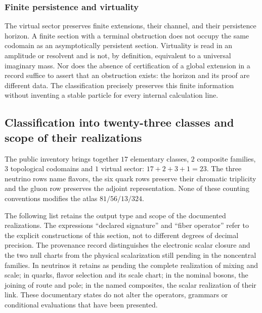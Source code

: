 \subsubsection{Finite persistence and virtuality}

The virtual sector preserves finite extensions, their channel, and their
persistence horizon. A finite section with a terminal obstruction does not occupy
the same codomain as an asymptotically persistent section. Virtuality
is read in an amplitude or resolvent and is not, by
definition, equivalent to a universal imaginary mass. Nor does the absence of
certification of a global extension in a record suffice to assert that
an obstruction exists: the horizon and its proof are different data.
The classification precisely preserves this finite information without
inventing a stable particle for every internal calculation line.

\subsection{Classification into twenty-three classes and scope of their realizations}
\label{vi:vi:subsec:23-clases}

The public inventory brings together \(17\) elementary classes, \(2\) composite
families, \(3\) topological codomains and \(1\) virtual sector:
\(17+2+3+1=23\). The three neutrino rows name flavors, the
six quark rows preserve their chromatic triplicity and the gluon row
preserves the adjoint representation. None of these counting
conventions modifies the atlas \(81/56/13/324\).

The following list retains the output type and scope of the
documented realizations. The expressions “declared signature” and
“fiber operator” refer to the explicit constructions of this
section, not to different degrees of decimal precision.
The provenance record distinguishes the electronic scalar closure and
the two null charts from the physical scalarization still pending in
the noncentral families. In neutrinos it retains as pending the
complete realization of mixing and scale; in quarks, flavor
selection and its scale chart; in the nominal bosons, the joining of route
and pole; in the named composites, the scalar realization of their
link. These documentary states do not alter the operators,
grammars or conditional evaluations that have been presented.

